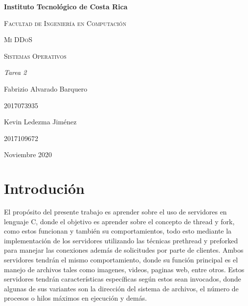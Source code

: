 \documentclass{report}
\begin{document}
\begin{titlepage}
\centering
{\bfseries\LARGE Instituto Tecnol\'ogico de Costa Rica \par}
\vspace{1cm}
{\scshape\Large Facultad de Ingenier\'ia en Computaci\'on \par}
\vspace{3cm}
{\scshape\Huge Mi DDoS\par}
{\scshape\Huge Sistemas Operativos\par}
\vspace{3cm}
{\itshape\Large Tarea 2\par}
\vfill
{\Large Fabrizio Alvarado Barquero\par}
{\Large 2017073935\par}
{\Large Kevin Ledezma Jim\'enez\par}
{\Large 2017109672\par}
\vfill
{\Large Noviembre 2020 \par}
\end{titlepage}
\newpage
\section{Introduci\'on}
\newline
El prop\'osito del presente trabajo es aprender sobre el uso de servidores en lenguaje C, donde el objetivo es aprender sobre el concepto de thread y fork, como estos funcionan y tambi\'en su comportamientos, todo esto mediante la implementaci\'on de los servidores utilizando las técnicas prethread y preforked para manejar las conexiones además de solicitudes por parte de clientes.\newline
\newline
Ambos servidores tendr\'an el mismo comportamiento, donde su funci\'on principal es el manejo de archivos tales como imagenes, videos, paginas web, entre otros.\newline
\newline
Estos servidores tendr\'an caracter\'isticas espec\'ificas seg\'un estos sean invocados, donde algunas de sus variantes son la direcci\'on del sistema de archivos, el n\'umero de procesos o hilos m\'aximos en ejecuci\'on y dem\'as.
\newpage
\end{document}
